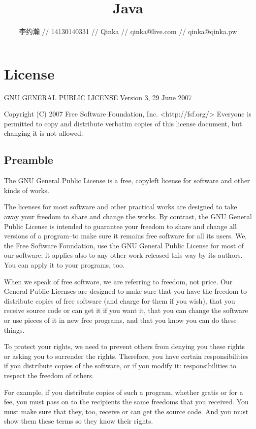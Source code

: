 \documentclass{ctexart}
\author{李约瀚 // 14130140331 // Qinka // qinka@live.com // qinka@qinka.pw}
\title{Java}
\begin{document}
\maketitle
\newpage

\section*{License}
\begin{center}
                      GNU GENERAL PUBLIC LICENSE
                       Version 3, 29 June 2007
\end{center}

 Copyright (C) 2007 Free Software Foundation, Inc. <http://fsf.org/>
 Everyone is permitted to copy and distribute verbatim copies
 of this license document, but changing it is not allowed.

\subsection*{Preamble}

  The GNU General Public License is a free, copyleft license for
software and other kinds of works.

  The licenses for most software and other practical works are designed
to take away your freedom to share and change the works.  By contrast,
the GNU General Public License is intended to guarantee your freedom to
share and change all versions of a program--to make sure it remains free
software for all its users.  We, the Free Software Foundation, use the
GNU General Public License for most of our software; it applies also to
any other work released this way by its authors.  You can apply it to
your programs, too.

  When we speak of free software, we are referring to freedom, not
price.  Our General Public Licenses are designed to make sure that you
have the freedom to distribute copies of free software (and charge for
them if you wish), that you receive source code or can get it if you
want it, that you can change the software or use pieces of it in new
free programs, and that you know you can do these things.

  To protect your rights, we need to prevent others from denying you
these rights or asking you to surrender the rights.  Therefore, you have
certain responsibilities if you distribute copies of the software, or if
you modify it: responsibilities to respect the freedom of others.

  For example, if you distribute copies of such a program, whether
gratis or for a fee, you must pass on to the recipients the same
freedoms that you received.  You must make sure that they, too, receive
or can get the source code.  And you must show them these terms so they
know their rights.
\end{document}
